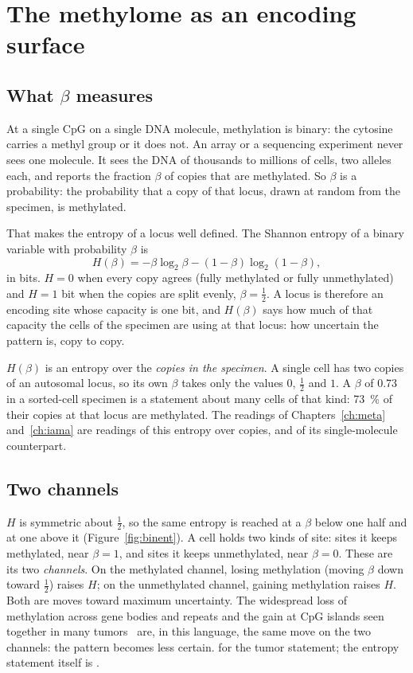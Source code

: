 \chapter{The methylome as an encoding surface}\label{ch:surface}

\section{What $\beta$ measures}

At a single CpG on a single DNA molecule, methylation is binary: the cytosine carries a methyl group
or it does not. An array or a sequencing experiment never sees one molecule. It sees the DNA of
thousands to millions of cells, two alleles each, and reports the fraction $\beta$ of copies that
are methylated. So $\beta$ is a probability: the probability that a copy of that locus, drawn at
random from the specimen, is methylated.

That makes the entropy of a locus well defined. The Shannon entropy of a binary variable with
probability $\beta$ is
\begin{equation}
  H(\beta)=-\beta\log_2\beta-(1-\beta)\log_2(1-\beta),
  \label{eq:H}
\end{equation}
in bits. $H=0$ when every copy agrees (fully methylated or fully unmethylated) and $H=1$ bit when
the copies are split evenly, $\beta=\tfrac12$. \derived{} A locus is therefore an encoding site
whose capacity is one bit, and $H(\beta)$ says how much of that capacity the cells of the specimen are
using at that locus: how uncertain the pattern is, copy to copy.

\begin{remark}
$H(\beta)$ is an entropy over the \emph{copies in the specimen}. A single cell has two copies of an
autosomal locus, so its own $\beta$ takes only the values $0$, $\tfrac12$ and $1$. A $\beta$ of 0.73
in a sorted-cell specimen is a statement about many cells of that kind: 73~\% of their copies at
that locus are methylated. The readings of Chapters~\ref{ch:meta} and~\ref{ch:iama} are readings of this entropy over copies, and of its single-molecule counterpart.
\end{remark}

\section{Two channels}

$H$ is symmetric about $\tfrac12$, so the same entropy is reached at a $\beta$ below one half and at one above it
(Figure~\ref{fig:binent}). A cell holds two kinds of site: sites it keeps methylated, near $\beta=1$, and sites it keeps
unmethylated, near $\beta=0$. These are its two \emph{channels}. On the methylated channel, losing methylation (moving $\beta$
down toward $\tfrac12$) raises $H$; on the unmethylated channel, gaining methylation raises $H$. Both are moves toward maximum
uncertainty. The widespread loss of methylation across gene bodies and repeats and the gain at CpG islands seen together in
many tumors~\cite{Baylin2011} are, in this language, the same move on the two channels: the pattern becomes less certain.
\analogy{} for the tumor statement; the entropy statement itself is \derived.

